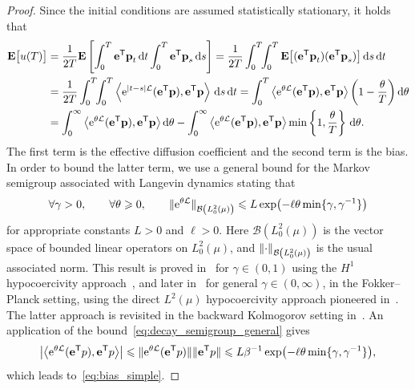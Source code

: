 \documentclass[11pt,a4paper]{article}
\newcommand{\e}{\mathrm{e}}
\newcommand{\expect}[0]{\mathbf{E}}
\newcommand{\vect}[1]{\boldsymbol{\mathbf #1}}
\renewcommand{\d}{\mathrm d}
\renewcommand{\t}{\mathsf T}
\theoremstyle{plain}
\numberwithin{equation}{section}
\renewcommand{\leq}{\leqslant}
\renewcommand{\geq}{\geqslant}
\begin{document}
\begin{proof}
Since the initial conditions are assumed statistically stationary,
it holds that
\begin{equation}
\label{eq:bias_without_control}
\begin{aligned}[b]
    \expect \bigl[u(T)\bigr]
    &= \frac{1}{2T} \expect \left[ \int_{0}^{T} \vect e^\t \vect p_{t} \, \d t \int_{0}^{T} \vect e^\t \vect p_s \, \d s \right]
    = \frac{1}{2T}  \int_{0}^{T} \!\! \int_{0}^{T} \expect \bigl[ (\vect e^\t \vect p_t) (\vect e^\t \vect p_s) \bigr] \, \d s \, \d t  \\
    &= \frac{1}{2T}  \int_{0}^{T} \!\! \int_{0}^{T} \ip{\e^{\abs{t - s} \mathcal L}(\vect e^\t \vect p)}{\vect e^\t \vect p} \, \d s \, \d t
    =  \int_{0}^{T} \ip{\e^{\theta \mathcal L} (\vect e^\t \vect p)}{\vect e^\t \vect p} \left(1 - \frac{\theta}{T}\right) \d \theta  \\
    &= \int_{0}^{\infty} \ip{\e^{\theta \mathcal L}(\vect e^\t \vect p)}{\vect e^\t \vect p}  \d \theta
    - \int_{0}^{\infty} \ip{\e^{\theta \mathcal L} (\vect e^\t \vect p)}{\vect e^\t \vect p} \min\left\{1, \frac{\theta}{T}\right\} \, \d \theta.
\end{aligned}
\end{equation}
The first term is the effective diffusion coefficient
and the second term is the bias.
In order to bound the latter term,
we use a general bound for the Markov semigroup associated with Langevin dynamics
stating that
\begin{equation}
    \label{eq:decay_semigroup_general}
    \forall \gamma > 0, \qquad \forall \theta \geq 0, \qquad
    \norm*{ \e^{\theta \mathcal L} }[\mathcal B \left(L^2_0\left(\mu\right) \right)] \leq L \exp \bigl(- \ell \theta \min\{\gamma, \gamma^{-1}\} \bigr)
\end{equation}
for appropriate constants $L > 0$ and $\ell > 0$.
Here $\mathcal B\left(L^2_0(\mu)\right)$ is the vector space of bounded linear operators on $L^2_0(\mu)$,
and $\norm{\cdot}_{\mathcal B\left(L^2_0(\mu)\right)}$ is the usual associated norm.
This result is proved in~\cite{MR2394704} for $\gamma \in (0, 1)$ using the $H^1$ hypocoercivity approach~\cite{MR2562709},
and later in~\cite{MR3106879} for general $\gamma \in (0, \infty)$, in the Fokker--Planck setting,
using the direct $L^2(\mu)$ hypocoercivity approach pioneered in~\cite{MR2576899,MR3324910}.
The latter approach is revisited in the backward Kolmogorov setting in~\cite{MR3522857,roussel2018spectral}.
An application of the bound~\eqref{eq:decay_semigroup_general} gives
\begin{equation}
    \label{eq:initial_bound_velocity_autocorrelation}
    \left\lvert \ip{\e^{\theta \mathcal L}(\vect e^\t p)}{\vect e^\t p} \right\rvert
    \leq \norm*{\e^{\theta \mathcal L}(\vect e^\t p)} \norm*{\vect e^\t p}
    \leq L \beta^{-1} \exp\bigl(- \ell \theta \min\{\gamma, \gamma^{-1}\}\bigr),
\end{equation}
which leads to~\eqref{eq:bias_simple}.
\end{proof}
\end{document}
